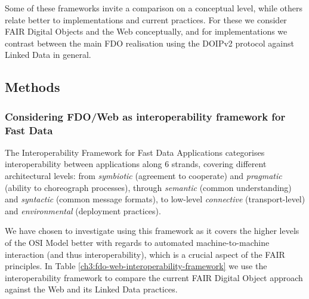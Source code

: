 Some of these frameworks invite a comparison on a conceptual level, while others relate better to implementations and current practices. For these we consider FAIR Digital Objects and the Web conceptually, and for implementations we contrast between the main FDO realisation using the DOIPv2 protocol \cite{foundationDigitalObjectInterface} against Linked Data in general.



\subsection{Methods}


\hypertarget{ch3:interoperability-compare}{%
\subsubsection{Considering FDO/Web as interoperability framework for Fast Data}\label{ch3:interoperability-compare}}

The Interoperability Framework for Fast Data Applications \cite{delgadoInteroperabilityFrameworkDistributed2016a} categorises interoperability between applications along 6 strands, covering different architectural levels: from \emph{symbiotic} (agreement to cooperate) and \emph{pragmatic} (ability to choreograph processes), through \emph{semantic} (common understanding) and \emph{syntactic} (common message formats), to low-level \emph{connective} (transport-level) and \emph{environmental} (deployment practices).

We have chosen to investigate using this framework as it covers the higher levels of the OSI Model \cite{stallingsHandbookComputercommunicationsStandards1990} better with regards to automated machine-to-machine interaction (and thus interoperability), which is a crucial aspect of the FAIR principles. In Table \vref{ch3:fdo-web-interoperability-framework} we use the interoperability framework to compare the current FAIR Digital Object approach against the Web and its Linked Data practices.

